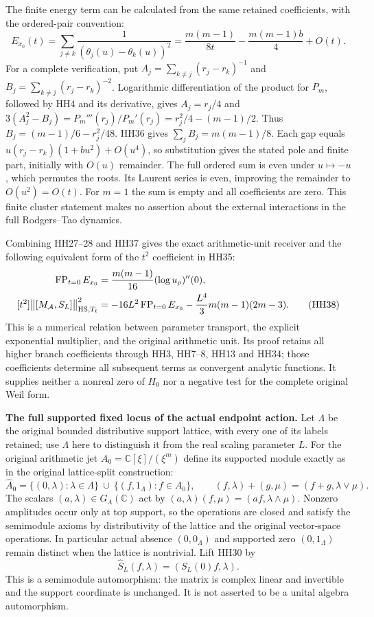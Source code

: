 \documentclass[11pt,a4paper]{article}
\theoremstyle{definition}\newtheorem{definition}[theorem]{Definition}
\begin{document}
The finite energy term can be calculated from the same retained
coefficients, with the ordered-pair convention:
\[
 E_{x_0}(t)=\sum_{j\ne k}
        \frac1{(\theta_j(u)-\theta_k(u))^2}
     =\frac{m(m-1)}{8t}-\frac{m(m-1)b}{4}+O(t).
 \tag{HH37}\label{hh:energy}
\]
For a complete verification, put
$A_j=\sum_{k\ne j}(r_j-r_k)^{-1}$ and
$B_j=\sum_{k\ne j}(r_j-r_k)^{-2}$.
Logarithmic differentiation of the product for $P_m$, followed by
HH4 and its derivative, gives
$A_j=r_j/4$ and
$3(A_j^2-B_j)=P_m'''(r_j)/P_m'(r_j)
=r_j^2/4-(m-1)/2$.
Thus $B_j=(m-1)/6-r_j^2/48$.
HH36 gives $\sum_jB_j=m(m-1)/8$.
Each gap equals $u(r_j-r_k)(1+bu^2)+O(u^4)$, so substitution gives
the stated pole and finite part, initially with $O(u)$ remainder.
The full ordered sum is even under $u\mapsto-u$, which permutes
the roots. Its Laurent series is even, improving the remainder
to $O(u^2)=O(t)$. For $m=1$ the sum is empty and all coefficients
are zero. This finite cluster statement makes no assertion about
the external interactions in the full Rodgers--Tao dynamics.

Combining HH27--28 and HH37 gives the exact arithmetic-unit receiver
and the following equivalent form of the $t^2$ coefficient in HH35:
\begin{align}
 \operatorname{FP}_{t=0}E_{x_0}
       &=\frac{m(m-1)}{16}(\log u_\rho)''(0),\notag\\
 [t^2]\bigl\|[M_{\mathcal A},S_L]\bigr\|_{\mathrm{HS},T_t}^2
       &=-16L^2\operatorname{FP}_{t=0}E_{x_0}
                    -\frac{L^4}{3}m(m-1)(2m-3).
 \tag{HH38}\label{hh:energy-receiver}
\end{align}
This is a numerical relation between parameter transport, the
explicit exponential multiplier, and the original arithmetic unit.
Its proof retains all higher branch coefficients through HH3,
HH7--8, HH13 and HH34; those coefficients determine all subsequent
terms as convergent analytic functions. It supplies neither a
nonreal zero of $H_0$ nor a negative test for the complete original
Weil form.

\HH\textbf{The full supported fixed locus of the actual endpoint action.}
Let $\Lambda$ be the original bounded distributive support lattice,
with every one of its labels retained; use $\Lambda$ here to
distinguish it from the real scaling parameter $L$.
For the original arithmetic jet $A_0=\mathbb C[\xi]/(\xi^m)$ define
its supported module exactly as in the original lattice-split
construction:
\[
 \widehat A_0=
   \{(0,\lambda):\lambda\in\Lambda\}
       \ \cup\ \{(f,1_\Lambda):f\in A_0\},\qquad
 (f,\lambda)+(g,\mu)=(f+g,\lambda\vee\mu).
 \tag{HH39}\label{hh:supported-module}
\]
The scalars $(a,\lambda)\in G_\Lambda(\mathbb C)$ act by
$(a,\lambda)(f,\mu)=(af,\lambda\wedge\mu)$.
Nonzero amplitudes occur only at top support, so the operations
are closed and satisfy the semimodule axioms by distributivity
of the lattice and the original vector-space operations.
In particular actual absence $(0,0_\Lambda)$ and supported zero
$(0,1_\Lambda)$ remain distinct when the lattice is nontrivial.
Lift HH30 by
\[
 \widehat S_L(f,\lambda)=(S_L(0)f,\lambda).
 \tag{HH40}
\]
This is a semimodule automorphism: the matrix is complex linear and
invertible and the support coordinate is unchanged.
It is not asserted to be a unital algebra automorphism.
\end{document}
